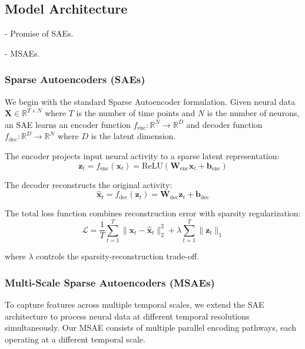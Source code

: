 \subsection{Model Architecture}

- Promise of SAEs.

- MSAEs.

\subsubsection{Sparse Autoencoders (SAEs)}

We begin with the standard Sparse Autoencoder formulation. Given neural data $\mathbf{X} \in \mathbb{R}^{T \times N}$ where $T$ is the number of time points and $N$ is the number of neurons, an SAE learns an encoder function $f_{\text{enc}}: \mathbb{R}^N \rightarrow \mathbb{R}^D$ and decoder function $f_{\text{dec}}: \mathbb{R}^D \rightarrow \mathbb{R}^N$ where $D$ is the latent dimension.

The encoder projects input neural activity to a sparse latent representation:
\begin{equation}
\mathbf{z}_t = f_{\text{enc}}(\mathbf{x}_t) = \text{ReLU}(\mathbf{W}_{\text{enc}} \mathbf{x}_t + \mathbf{b}_{\text{enc}})
\end{equation}

The decoder reconstructs the original activity:
\begin{equation}
\hat{\mathbf{x}}_t = f_{\text{dec}}(\mathbf{z}_t) = \mathbf{W}_{\text{dec}} \mathbf{z}_t + \mathbf{b}_{\text{dec}}
\end{equation}

The total loss function combines reconstruction error with sparsity regularization:
\begin{equation}
\mathcal{L} = \frac{1}{T} \sum_{t=1}^{T} \|\mathbf{x}_t - \hat{\mathbf{x}}_t\|_2^2 + \lambda \sum_{t=1}^{T} \|\mathbf{z}_t\|_1
\end{equation}

where $\lambda$ controls the sparsity-reconstruction trade-off.

\subsubsection{Multi-Scale Sparse Autoencoders (MSAEs)}

To capture features across multiple temporal scales, we extend the SAE architecture to process neural data at different temporal resolutions simultaneously. Our MSAE consists of multiple parallel encoding pathways, each operating at a different temporal scale.

